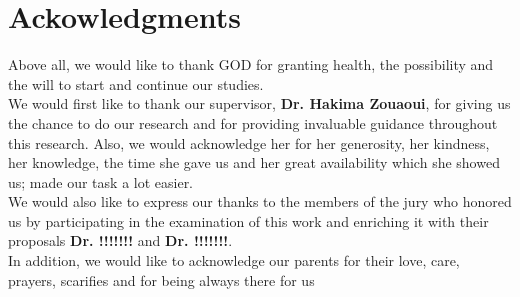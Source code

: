 \chapter*{\hfill Ackowledgments \hfill}

\vspace{3cm}

Above all, we would like to thank GOD for granting health, the possibility and the will to start and continue our studies.\\

We would first like to thank our supervisor,  \textbf{Dr. Hakima Zouaoui}, for giving us the chance to do our research and for providing invaluable guidance throughout this research. Also, we would acknowledge her for her generosity, her kindness, her knowledge, the time she gave us and her great availability which she showed us; made our task a lot easier.\\

We would also like to express our thanks to the members of the jury who honored us by participating in the examination of this work and enriching it with their proposals \textbf{Dr. !!!!!!!} and \textbf{Dr. !!!!!!!}.\\

In addition, we would like to acknowledge our parents for their love, care, prayers, scarifies and for being always there for us